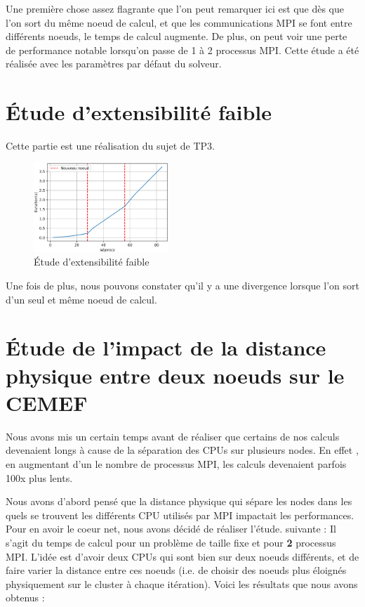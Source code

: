 \documentclass[10pt,twocolumn,letterpaper]{article}
\begin{document}
Une première chose assez flagrante que l'on peut remarquer ici est que dès que
l'on sort du même noeud de calcul, et que les communications MPI se font entre 
différents noeuds, le temps de calcul augmente.
De plus, on peut voir une perte de performance notable lorsqu'on passe de 1 à 2
processus MPI. Cette étude a été réalisée avec les paramètres par défaut du
solveur.

\section{Étude d'extensibilité faible}

Cette partie est une réalisation du sujet de TP3.

\begin{figure}[H]
    \centering
    \caption{Étude d'extensibilité faible}
    \includegraphics[width=0.45\textwidth]{fig/weak_scalab.png}
  \end{figure}


Une fois de plus, nous pouvons constater qu'il y a une divergence lorsque l'on
sort d'un seul et même noeud de calcul.

\section{Étude de l'impact de la distance physique entre deux 
noeuds sur le CEMEF}

Nous avons mis un certain temps avant de réaliser que certains de nos calculs
devenaient longs à cause de la séparation des CPUs sur plusieurs nodes. En effet
, en augmentant d'un le nombre de processus MPI, les calculs devenaient parfois
100x plus lents. 

Nous avons d'abord pensé que la distance physique qui sépare les nodes dans
les quels se trouvent les différents CPU utilisés par MPI impactait les
performances. Pour en avoir le coeur net, nous avons décidé de réaliser l'étude.
suivante : 
Il s'agit du temps de calcul pour un problème de taille fixe et pour \textbf{2}
processus MPI. L'idée est d'avoir deux CPUs qui sont bien sur deux noeuds
différents, et de faire varier la distance entre ces noeuds
(i.e. de choisir des noeuds plus éloignés physiquement sur le cluster à chaque
itération). Voici les résultats que nous avons obtenus :
\end{document}
